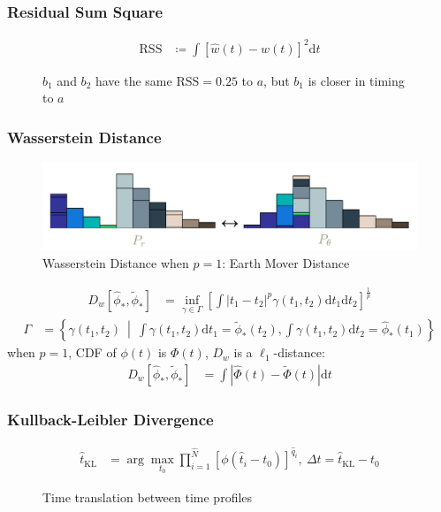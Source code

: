 \documentclass{beamer}
\begin{document}
\begin{CJK*}{UTF8}{gbsn}
\begin{frame}
\frametitle{Residual Sum Square}
\begin{align*}
  \mathrm{RSS} &\coloneqq \int\left[\hat{w}(t) - w(t)\right]^2\mathrm{d}t
\end{align*}
\begin{figure}
    \centering
    \resizebox{1.0\textwidth}{!}{}
    \caption{$b_1$ and $b_2$ have the same $\mathrm{RSS}=0.25$ to $a$, but $b_1$ is closer in timing to $a$}
\end{figure}
\end{frame}

\begin{frame}
\frametitle{Wasserstein Distance}
\begin{figure}
    \centering
    \includegraphics[width=1.0\linewidth]{img/WD.png}
    \caption{Wasserstein Distance when $p=1$: Earth Mover Distance}  
\end{figure}
\begin{align*}
  D_w\left[\hat{\phi}_*, \tilde{\phi}_*\right] &= \inf_{\gamma \in \Gamma} \left[\int \left\vert t_1 - t_2 \right\vert^p \gamma(t_1, t_2)\mathrm{d}t_1\mathrm{d}t_2\right]^{\frac{1}{p}}
\end{align*}
\begin{align*}
  \Gamma &= \left\{\gamma(t_1, t_2) ~\middle\vert~ \int\gamma(t_1,t_2)\mathrm{d}t_1 = \tilde{\phi}_*(t_2) , \int\gamma(t_1,t_2)\mathrm{d}t_2 = \hat{\phi}_*(t_1) \right\}
\end{align*}
when $p=1$, CDF of $\phi(t)$ is $\Phi(t)$, $D_w$ is a $\ell_1$-distance:
\begin{align*}
  D_w\left[\hat{\phi}_*, \tilde{\phi}_*\right] &= \int\left|\hat{\Phi}(t) - \tilde{\Phi}(t)\right| \mathrm{d}t
\end{align*}
\end{frame}

\begin{frame}
\frametitle{Kullback-Leibler Divergence}
\begin{align*}
  \hat{t}_\mathrm{KL} &= \arg\underset{t_0}{\max} \prod_{i=1}^{\hat{N}} \left[\phi(\hat{t}_i-t_0)\right]^{\hat{q}_i} ,\ \Delta t = \hat{t}_\mathrm{KL} - t_0
\end{align*}
\begin{figure}
    \centering
    \resizebox{0.6\textwidth}{!}{}
    \caption{Time translation between time profiles}
\end{figure}
\end{frame}


\end{CJK*}
\end{document}

